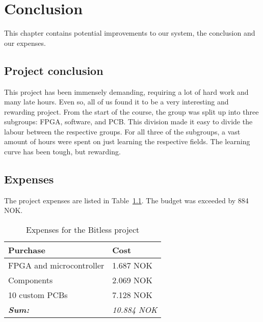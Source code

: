 
\chapter{Conclusion}

This chapter contains potential improvements to our system, the conclusion and our expenses.

\clearpage
\section{Project conclusion}

This project has been immensely demanding, requiring a lot of hard work and many
late hours. Even so, all of us found it to be
a very interesting and rewarding project. From the start of the course, the
group was split up into three subgroups: FPGA, software, and PCB. This division
made it easy to divide the labour between the respective groups. For
all three of the subgroups, a vast amount of hours were spent on just learning the
respective fields. The learning curve has been tough, but rewarding. 

\clearpage


\clearpage
\section{Expenses}
The project expenses are listed in Table~\ref{tab:budget}. The budget was exceeded by 884 NOK.

\begin{table}[H]
	\centering
	\begin{tabular}{|l|l|}
		\hline
		\textbf{Purchase} & \textbf{Cost} \\
		\hline
		\hline
		FPGA and microcontroller & 1.687 NOK\\
		\hline
		Components & 2.069 NOK\\
		\hline
		10 custom PCBs & 7.128 NOK \\
		\hline
		\hline
		\textbf{\textit{Sum:}} & \textit{10.884 NOK}\\
		\hline
	\end{tabular}
	\caption{Expenses for the Bitless project}
	\label{tab:budget}
\end{table}
